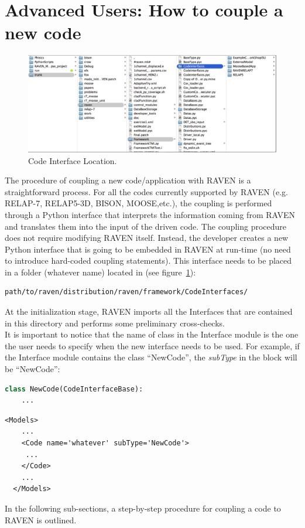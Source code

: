 \section{Advanced Users: How to couple a new code}
\label{sec:newCodeCoupling}
\begin{figure}
\centering
\includegraphics[width=1.0\textwidth]{pics/CodeInterfaceLocation.png}
\caption{Code Interface Location.}
\label{fig:codeinterface}
\end{figure}
The procedure of coupling a new code/application with RAVEN is a straightforward process.
For all the codes currently supported by RAVEN (e.g. RELAP-7, RELAP5-3D,
BISON, MOOSE,etc.), the coupling is performed through a Python interface that interprets the information coming from RAVEN and translates them into the
  input of the driven code.
The coupling procedure does not require modifying RAVEN itself. Instead, the developer creates a new Python interface that is going to be embedded
 in RAVEN at run-time (no need to introduce  hard-coded coupling statements).
 This interface needs to be placed in a folder (whatever name) located in (see figure~\ref{fig:codeinterface}):
\begin{lstlisting}[language=bash]
 path/to/raven/distribution/raven/framework/CodeInterfaces/
\end{lstlisting}
At the initialization stage, RAVEN imports all the Interfaces that are contained in this directory and performs some preliminary cross-checks.
\\It is important to notice that the name of class in the Interface module is the one the user needs to specify when the new interface 
needs to be used. For example, if the Interface module contains the class 	``NewCode'', the \textit{subType} in the  block will be 	``NewCode'':
\begin{lstlisting}[language=python]
  class NewCode(CodeInterfaceBase):
    ...
\end{lstlisting}
\begin{lstlisting}[style=XML,morekeywords={name,file}] %moreemph={name,file}]
  <Models>
    ...
    <Code name='whatever' subType='NewCode'>
     ...
    </Code>
    ...
  </Models>
\end{lstlisting}
In the following sub-sections, a step-by-step procedure for coupling a code to RAVEN is outlined.
